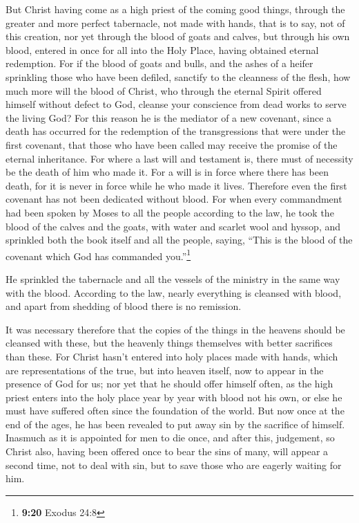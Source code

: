  But Christ having come as a high priest of the coming
good things, through the greater and more perfect tabernacle, not made
with hands, that is to say, not of this creation,  nor
yet through the blood of goats and calves, but through his own blood,
entered in once for all into the Holy Place, having obtained eternal
redemption.  For if the blood of goats and bulls, and the
ashes of a heifer sprinkling those who have been defiled, sanctify to
the cleanness of the flesh,  how much more will the blood
of Christ, who through the eternal Spirit offered himself without defect
to God, cleanse your conscience from dead works to serve the living God?
 For this reason he is the mediator of a new covenant,
since a death has occurred for the redemption of the transgressions that
were under the first covenant, that those who have been called may
receive the promise of the eternal inheritance.  For
where a last will and testament is, there must of necessity be the death
of him who made it.  For a will is in force where there
has been death, for it is never in force while he who made it lives.
 Therefore even the first covenant has not been dedicated
without blood.  For when every commandment had been
spoken by Moses to all the people according to the law, he took the
blood of the calves and the goats, with water and scarlet wool and
hyssop, and sprinkled both the book itself and all the people,
 saying, ``This is the blood of the covenant which God
has commanded you.''\footnote{\textbf{9:20} Exodus 24:8}

 He sprinkled the tabernacle and all the vessels of the
ministry in the same way with the blood.  According to
the law, nearly everything is cleansed with blood, and apart from
shedding of blood there is no remission.

 It was necessary therefore that the copies of the things
in the heavens should be cleansed with these, but the heavenly things
themselves with better sacrifices than these.  For Christ
hasn't entered into holy places made with hands, which are
representations of the true, but into heaven itself, now to appear in
the presence of God for us;  nor yet that he should offer
himself often, as the high priest enters into the holy place year by
year with blood not his own,  or else he must have
suffered often since the foundation of the world. But now once at the
end of the ages, he has been revealed to put away sin by the sacrifice
of himself.  Inasmuch as it is appointed for men to die
once, and after this, judgement,  so Christ also, having
been offered once to bear the sins of many, will appear a second time,
not to deal with sin, but to save those who are eagerly waiting for him.

